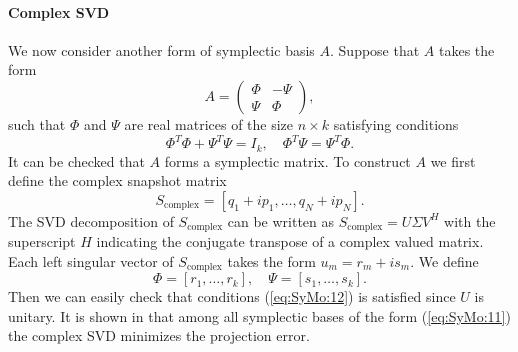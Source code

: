 \paragraph{\bf Complex SVD} We now consider another form of symplectic basis $A$. Suppose that $A$ takes the form
\begin{equation} \label{eq:SyMo:11}
	A = 
	\begin{pmatrix}
		\Phi & -\Psi \\
		\Psi & \Phi
	\end{pmatrix},
\end{equation}
such that $\Phi$ and $\Psi$ are real matrices of the size $n\times k$ satisfying conditions
\begin{equation} \label{eq:SyMo:12}
\Phi^T \Phi + \Psi^T \Psi = I_k,\quad \Phi^T \Psi = \Psi^T \Phi.
\end{equation}
It can be checked that $A$ forms a symplectic matrix. To construct $A$ we first define the complex snapshot matrix
\begin{equation} \label{eq:SyMo:13}
	S_{\text{complex}} = [ q_1 + i p_1, \dots , q_N + i p_N ].
\end{equation}
The SVD decomposition of $S_{\text{complex}}$ can be written as $S_{\text{complex}} = U \Sigma V^H$ with the superscript $H$ indicating the conjugate transpose of a complex valued matrix. Each left singular vector of $S_{\text{complex}}$ takes the form $u_m = r_m + i s_m$. We define
\begin{equation} \label{eq:SyMo:14}
	 \Phi = [r_1,\dots, r_k], \quad \Psi = [s_1,\dots, s_k].
\end{equation}
Then we can easily check that conditions (\ref{eq:SyMo:12}) is satisfied since $U$ is unitary. It is shown in \cite{Peng:2014di} that among all symplectic bases of the form (\ref{eq:SyMo:11}) the complex SVD minimizes the projection error.


%


